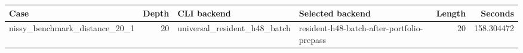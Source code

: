 {\small
\begin{tabular}{lrllrr}
\hline
Case & Depth & CLI backend & Selected backend & Length & Seconds \\
\hline
nissy\_benchmark\_distance\_20\_1 & 20 & universal\_resident\_h48\_batch & resident-h48-batch-after-portfolio-prepass & 20 & 158.304472 \\
\hline
\end{tabular}
}
